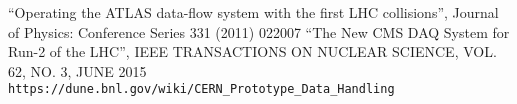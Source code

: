 \begin{thebibliography}{99}

 
 ``Operating the ATLAS data-flow system with the first LHC collisions'', Journal of Physics: Conference Series 331 (2011) 022007
 ``The New CMS DAQ System for Run-2 of the LHC'', IEEE TRANSACTIONS ON NUCLEAR SCIENCE, VOL. 62, NO. 3, JUNE 2015
 \verb!https://dune.bnl.gov/wiki/CERN_Prototype_Data_Handling!

\end{thebibliography}